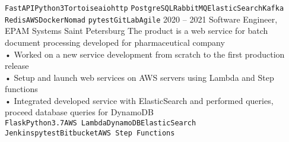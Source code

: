 {\begin{entrylist}
{			\texttt{FastAPI}\slashsep\texttt{Python3}\slashsep\texttt{Tortoise}\slashsep\texttt{aiohttp}\slashsep
			\texttt{PostgreSQL}\slashsep\texttt{RabbitMQ}\slashsep\texttt{ElasticSearch}\slashsep\texttt{Kafka}
			\slashsep\texttt{Redis}\slashsep\texttt{AWS}\slashsep\texttt{Docker}\slashsep\texttt{Nomad}\slashsep
			\texttt{pytest}\slashsep\texttt{GitLab}\slashsep\texttt{Agile}
		}
		\entry
		{2020 – 2021}
		{Software Engineer, EPAM Systems}
		{Saint Petersburg}
		{
		    The product is a web service for batch document processing developed for pharmaceutical company \\
			• Worked on a new service development from scratch to the first production release \\
            • Setup and launch web services on AWS servers using Lambda and Step functions \\
            • Integrated developed service with ElasticSearch and performed queries, proceed database queries for DynamoDB \\
			\texttt{Flask}\slashsep\texttt{Python3.7}\slashsep\texttt{AWS Lambda}\slashsep\texttt{DynamoDB}\slashsep\texttt{ElasticSearch}\\
			\texttt{Jenkins}\slashsep\texttt{pytest}\slashsep\texttt{Bitbucket}\slashsep\texttt{AWS Step Functions}
		}
	\end{entrylist}
}

\newcommand{\cvtemplateeducation}{Education}
\newcommand{\cveducation}{
	\begin{entrylist}
	    \entry
		{2018}
		{Python course, EPAM Systems}
		{Saint Petersburg}
		{
			During the course, all main Python topics have been learnt and put into practice.
			Developed a web service for getting some statistics from external API and displaying it in graphs view.\\
			\texttt{Python3}\slashsep\texttt{Flask}
		}
		\entry
		{2014 – 2020}
		{Bachelor/Master's Degrees in Software Engineering, ITMO University}
		{Saint Petersburg}
		{
			The final project was a web service for saving educational results based on Blockchain technology.\\
			\texttt{Python3}\slashsep\texttt{Django}\slashsep\texttt{SQLite}
		}
	\end{entrylist}
}

\newcommand{\cvtemplatecontacts}{Contacts}
\newcommand{\cvcontacts}{
	\icontext{At}{12}{\href{mailto:valeriiashestakova@gmail.com}{valeriiashestakova@gmail.com}}\\
	\icontext{Linkedin}{12}{\href{https://www.linkedin.com/in/lerushe/}{@lerushe}}\\
}
\newcommand{\cvtemplatelanguages}{Languages}
\newcommand{\cvlanguages}{
	\bubbles{
    	5/Russian,
    	4/English
	}{}
}
